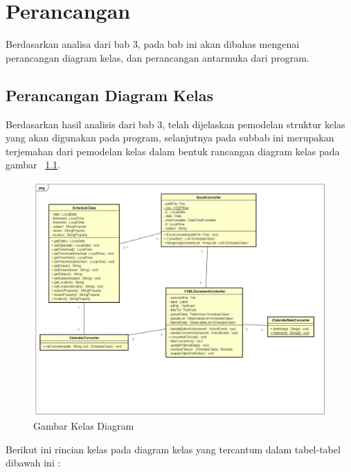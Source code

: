 \chapter{Perancangan}
\label{chap:design}

Berdasarkan analisa dari bab 3, pada bab ini akan dibahas mengenai perancangan diagram kelas, dan perancangan antarmuka dari
program.

\section{Perancangan Diagram Kelas}
Berdasarkan hasil analisis dari bab 3, telah dijelaskan pemodelan struktur kelas yang akan digunakan pada program, selanjutnya pada subbab ini merupakan terjemahan dari pemodelan kelas dalam bentuk rancangan diagram kelas pada gambar ~\ref{fig:pemodelan-kelas}.   
\begin{figure}[H]
	\centering
	\includegraphics[scale=0.4]{Gambar/kelas-diagram}
	\caption{Gambar Kelas Diagram}
	\label{fig:pemodelan-kelas}
\end{figure}

Berikut ini rincian kelas pada diagram kelas yang tercantum dalam tabel-tabel dibawah ini :

